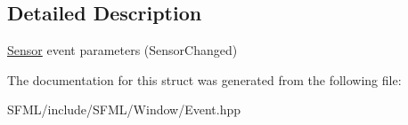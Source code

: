 \subsection{Detailed Description}
\mbox{\hyperlink{classsf_1_1_sensor}{Sensor}} event parameters (Sensor\+Changed) 

\begin{DoxyVerb}\end{DoxyVerb}
 

The documentation for this struct was generated from the following file\+:\begin{DoxyCompactItemize}
\item 
S\+F\+M\+L/include/\+S\+F\+M\+L/\+Window/Event.\+hpp\end{DoxyCompactItemize}
